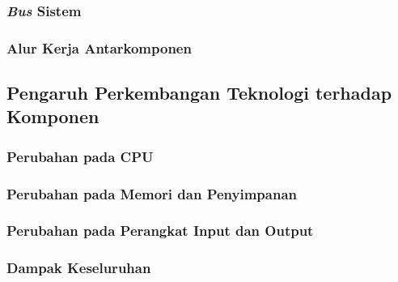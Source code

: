 \subsubsection{\textit{Bus} Sistem}
\subsubsection{Alur Kerja Antarkomponen}

\subsection{Pengaruh Perkembangan Teknologi terhadap Komponen}
\subsubsection{Perubahan pada CPU}
\subsubsection{Perubahan pada Memori dan Penyimpanan}
\subsubsection{Perubahan pada Perangkat Input dan Output}
\subsubsection{Dampak Keseluruhan}
